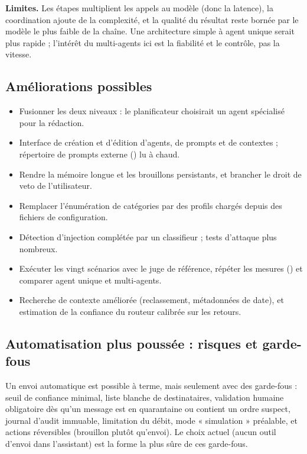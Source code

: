 \textbf{Limites.} Les étapes multiplient les appels au modèle (donc la latence), la coordination ajoute de la complexité, et la qualité du résultat reste bornée par le modèle le plus faible de la chaîne. Une architecture simple à agent unique serait plus rapide ; l'intérêt du multi-agents ici est la fiabilité et le contrôle, pas la vitesse.

\subsection{Améliorations possibles}
\begin{itemize}
  \item Fusionner les deux niveaux : le planificateur choisirait un agent spécialisé pour la rédaction.
  \item Interface de création et d'édition d'agents, de prompts et de contextes ; répertoire de prompts externe () lu à chaud.
  \item Rendre la mémoire longue et les brouillons persistants, et brancher le droit de veto de l'utilisateur.
  \item Remplacer l'énumération de catégories par des profils chargés depuis des fichiers de configuration.
  \item Détection d'injection complétée par un classifieur ; tests d'attaque plus nombreux.
  \item Exécuter les vingt scénarios avec le juge de référence, répéter les mesures () et comparer agent unique et multi-agents.
  \item Recherche de contexte améliorée (reclassement, métadonnées de date), et estimation de la confiance du routeur calibrée sur les retours.
\end{itemize}

\subsection{Automatisation plus poussée : risques et garde-fous}
Un envoi automatique est possible à terme, mais seulement avec des garde-fous : seuil de confiance minimal, liste blanche de destinataires, validation humaine obligatoire dès qu'un message est en quarantaine ou contient un ordre suspect, journal d'audit immuable, limitation du débit, mode « simulation » préalable, et actions réversibles (brouillon plutôt qu'envoi). Le choix actuel (aucun outil d'envoi dans l'assistant) est la forme la plus sûre de ces garde-fous.
